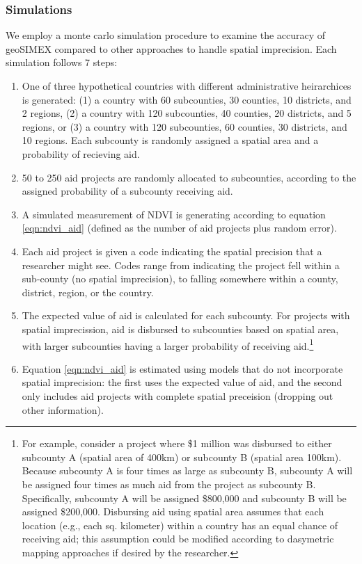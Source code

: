 \subsubsection{Simulations}

We employ a monte carlo simulation procedure to examine the accuracy of geoSIMEX compared to other approaches to handle spatial imprecision. 
Each simulation follows 7 steps:

\begin{enumerate}
\item One of three hypothetical countries with different administrative heirarchices is generated: (1) a country with 60 subcounties, 30 counties, 10 districts, and 2 regions, (2) a country with 120 subcounties, 40 counties, 20 districts, and 5 regions, or (3) a country with 120 subcounties, 60 counties, 30 districts, and 10 regions. Each subcounty is randomly assigned a spatial area and a probability of recieving aid. 
\item 50 to 250 aid projects are randomly allocated to subcounties, according to the assigned probability of a subcounty receiving aid. 
\item A simulated measurement of NDVI is generating according to equation \ref{eqn:ndvi_aid} (defined as the number of aid projects plus random error).
\item Each aid project is given a code indicating the spatial precision that a researcher might see. Codes range from indicating the project fell within a sub-county (no spatial imprecision), to falling somewhere within a county, district, region, or the country. 
\item The expected value of aid is calculated for each subcounty. For projects with spatial imprecission, aid is disbursed to subcounties based on spatial area, with larger subcounties having a larger probability of receiving aid.\footnote{For example, consider a project where \$1 million was disbursed to either subcounty A (spatial area of 400km) or subcounty B (spatial area 100km). Because subcounty A is four times as large as subcounty B, subcounty A will be assigned four times as much aid from the project as subcounty B. Specifically, subcounty A will be assigned \$800,000 and subcounty B will be assigned \$200,000. Disbursing aid using spatial area assumes that each location (e.g., each sq. kilometer) within a country has an equal chance of receiving aid; this assumption could be modified according to dasymetric mapping approaches if desired by the researcher.}
\item Equation \ref{eqn:ndvi_aid} is estimated using  models that do not incorporate spatial imprecision: the first uses the expected value of aid, and the second only includes aid projects with complete spatial preceision (dropping out other information).

\end{enumerate}
